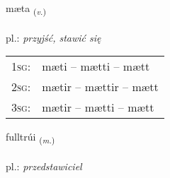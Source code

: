 \documentclass[frontgrid, backgrid]{flacards}\usepackage[]{graphicx}\usepackage[]{xcolor}
\begin{document}
\renewcommand{\flhead}{\vskip5pt \fboxsep=0pt {\small\bfseries\footnotesize Sagnorð | czasownik}}
\renewcommand{\fcfoot}{\vskip5pt \fboxsep=0pt \hspace{2pt}{\small\bfseries\footnotesize 1K}}

\renewcommand{\blhead}{\vskip5pt {\small\bfseries\footnotesize Sagnorð | czasownik }}
\renewcommand{\bcfoot}{\vskip5pt \hspace{2pt}{\small\bfseries\footnotesize 1K}}


{mæta \small{\textsubscript{(\textit{v.})}} \\[1ex] %
\textphonetic{[maiːta]} \\
pl.: \emph{przyjść, stawić się} \\  [2ex]
\renewcommand*{\arraystretch}{0.8}
\begin{tabular}{p{1cm}l}
\textsc{1sg}: & mæti -- mætti -- mætt \\ 
\textsc{2sg}: & mætir -- mættir -- mætt \\ 
\textsc{3sg}: & mætir -- mætti -- mætt \\ 
\end{tabular}
}

\renewcommand{\flhead}{\vskip5pt \fboxsep=0pt {\small\bfseries\footnotesize Nafnorð | rzeczownik}}
\renewcommand{\fcfoot}{\vskip5pt \fboxsep=0pt \hspace{2pt}{\small\bfseries\footnotesize 1K}}

\renewcommand{\blhead}{\vskip5pt {\small\bfseries\footnotesize Nafnorð | rzeczownik }}
\renewcommand{\bcfoot}{\vskip5pt \hspace{2pt}{\small\bfseries\footnotesize 1K}}


{fulltrúi \small{\textsubscript{(\textit{m.})}} \\[1ex] %
 \\
pl.: \emph{przedstawiciel} \\  [2ex]
\renewcommand*{\arraystretch}{0.8}
}
\end{document}
